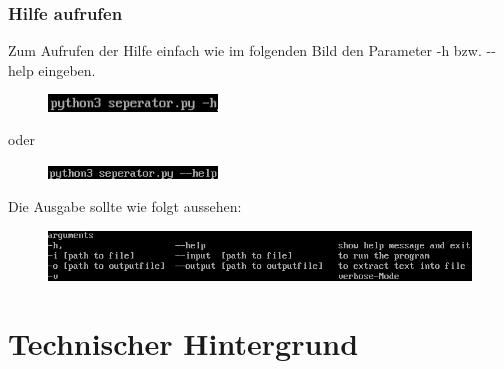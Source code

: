 \documentclass[12pt]{scrartcl}
\begin{document}
\subsubsection{Hilfe aufrufen}
\label{sec:first-steps-help}
Zum Aufrufen der Hilfe einfach wie im folgenden Bild den Parameter -h bzw. -{}-help eingeben.
\newline
\begin{figure}[htbp]
\centering
\includegraphics[width=0.4\textwidth]{ersteSchritteHilfeSeperator1}\par\vspace{0.25cm}
\label{fig:ersteSchritteHilfeSeperator1}
\end{figure}
\begin{center}
oder
\end{center}
\begin{figure}[htbp]
\centering
\includegraphics[width=0.4\textwidth]{ersteSchritteHilfeSeperator2}\par\vspace{0.25cm}
\label{fig:ersteSchritteHilfeSeperator2}
\end{figure}
Die Ausgabe sollte wie folgt aussehen:
\begin{figure}[htbp]
\centering
\includegraphics[width=1.1\textwidth]{ersteSchritteHilfeSeperator3}\par\vspace{0.5cm}
\label{fig:ersteSchritteHilfeSeperator3}
\end{figure}




\newpage

\section{Technischer Hintergrund}
\label{sec:technical-background}
\end{document}
